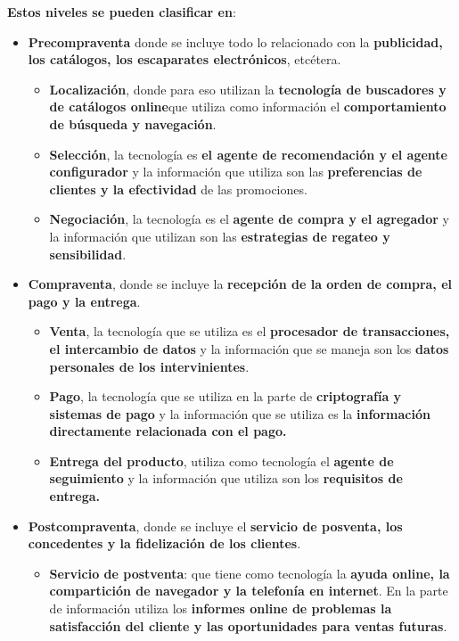 \documentclass[12pt, twoside, openright]{report} %
\begin{document}
\textbf{Estos niveles se pueden clasificar en}:
\begin{itemize}
	\item \textbf{Precompraventa} donde se incluye todo lo relacionado con la \textbf{publicidad, los catálogos, los escaparates electrónicos}, etcétera.
	\begin{itemize}
		\item \textbf{Localización}, donde para eso utilizan la \textbf{tecnología de buscadores y de catálogos online}que utiliza como información el \textbf{comportamiento de búsqueda y navegación}.
		\item \textbf{Selección}, la tecnología es \textbf{el agente de recomendación y el agente configurador} y la información que utiliza son las \textbf{preferencias de clientes y la efectividad} de las promociones.
		\item \textbf{Negociación}, la tecnología es el \textbf{agente de compra y el agregador} y la información que utilizan son las \textbf{estrategias de regateo y sensibilidad}.
	\end{itemize}
	
	\item \textbf{Compraventa}, donde se incluye la \textbf{recepción de la orden de compra, el pago y la entrega}.
	\begin{itemize}
		\item \textbf{Venta}, la tecnología que se utiliza es el \textbf{procesador de transacciones, el intercambio de datos} y la información que se maneja son los \textbf{datos personales de los intervinientes}.
		\item \textbf{Pago}, la tecnología que se utiliza en la parte de \textbf{criptografía y sistemas de pago} y la información que se utiliza es la \textbf{información directamente relacionada con el pago.}
		\item \textbf{Entrega del producto}, utiliza como tecnología el \textbf{agente de seguimiento} y la información que utiliza son los \textbf{requisitos de entrega.}
	\end{itemize}
	\item \textbf{Postcompraventa}, donde se incluye el \textbf{servicio de posventa, los concedentes y la fidelización de los clientes}.
	\begin{itemize}
		\item \textbf{Servicio de postventa}: que tiene como tecnología la \textbf{ayuda online, la compartición de navegador y la telefonía en internet}. En la parte de información utiliza los \textbf{informes online de problemas la satisfacción del cliente y las oportunidades para ventas futuras}.
	\end{itemize}
\end{itemize}
\end{document}
